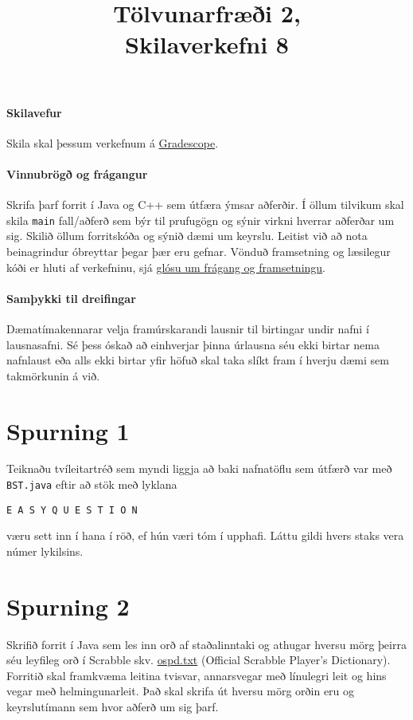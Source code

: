 \documentclass{article}
\title{Tölvunarfræði 2, \semester \\ Skilaverkefni 8}
\author{}
\begin{document}
\maketitle
{}

\paragraph{Skilavefur} Skila skal þessum verkefnum á \href{https://gradescope.com/courses/5640}{Gradescope}.

\paragraph{Vinnubrögð og frágangur} Skrifa þarf forrit í Java og C++ sem útfæra ýmsar aðferðir. Í öllum tilvikum skal skila \texttt{main} fall/aðferð sem býr til prufugögn og sýnir virkni hverrar aðferðar um sig. Skilið öllum forritskóða og sýnið dæmi um keyrslu. Leitist við að nota beinagrindur óbreyttar þegar þær eru gefnar. Vönduð framsetning og læsilegur kóði er hluti af verkefninu, sjá \href{https://piazza.com/class/ixkicfen49l111?cid=52}{glósu um frágang og framsetningu}.

\paragraph{Samþykki til dreifingar} Dæmatímakennarar velja framúrskarandi lausnir til birtingar undir nafni í lausnasafni. Sé þess óskað að einhverjar þinna úrlausna séu ekki birtar nema nafnlaust eða alls ekki birtar yfir höfuð skal taka slíkt fram í hverju dæmi sem takmörkunin á við.

\section{Spurning 1}
Teiknaðu tvíleitartréð sem myndi liggja að baki nafnatöflu sem útfærð var með \texttt{BST.java} eftir að stök með lyklana
\begin{center}
\texttt{E A S Y Q U E S T I O N} 
\end{center}
væru sett inn í hana í röð, ef hún væri tóm í upphafi. Láttu gildi hvers staks vera númer lykilsins.

\section{Spurning 2}
Skrifið forrit í Java sem les inn orð af staðalinntaki og athugar hversu mörg þeirra séu leyfileg orð í Scrabble skv. \href{http://introcs.cs.princeton.edu/java/data/ospd.txt}{ospd.txt} (Official Scrabble Player's Dictionary). Forritið skal framkvæma leitina tvisvar, annarsvegar með línulegri leit og hins vegar með helmingunarleit. Það skal skrifa út hversu mörg orðin eru og keyrslutímann sem hvor aðferð um sig þarf.
\end{document}
